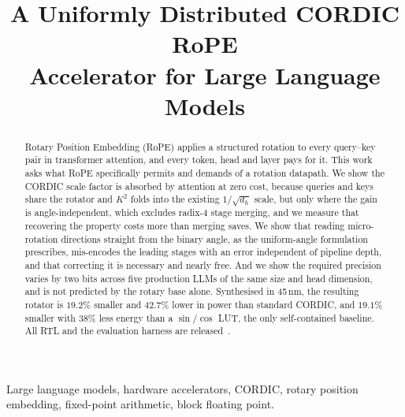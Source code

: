 \documentclass[conference]{IEEEtran}
\begin{document}
\title{A Uniformly Distributed CORDIC RoPE\\Accelerator for Large Language Models}

\author{
\and
{}
\and
{}
}

\maketitle

\begin{abstract}
Rotary Position Embedding (RoPE) applies a structured rotation to every
query--key pair in transformer attention, and every token, head and layer pays
for it. This work asks what RoPE specifically permits and demands of a rotation
datapath. We show the CORDIC scale factor is absorbed by attention at zero
cost, because queries and keys share the rotator and $K^2$ folds into the
existing $1/\sqrt{d_h}$ scale, but only where the gain is angle-independent,
which excludes radix-4 stage merging, and we measure that recovering the
property costs more than merging saves. We show that reading micro-rotation
directions straight from the binary angle, as the uniform-angle formulation
prescribes, mis-encodes the leading stages with an error independent of
pipeline depth, and that correcting it is necessary and nearly free.
And we show the required precision varies by two bits across five
production LLMs of the same size and head dimension, and is not predicted by
the rotary base alone.
Synthesised in 45\,nm, the resulting rotator is $19.2\%$ smaller and $42.7\%$
lower in power than standard CORDIC, and $19.1\%$ smaller with $38\%$ less
energy than a $\sin/\cos$ LUT, the only self-contained baseline. All RTL and
the evaluation harness are released~\cite{github}.
\end{abstract}

\begin{IEEEkeywords}
Large language models, hardware accelerators, CORDIC, rotary position
embedding, fixed-point arithmetic, block floating point.
\end{IEEEkeywords}
\end{document}
